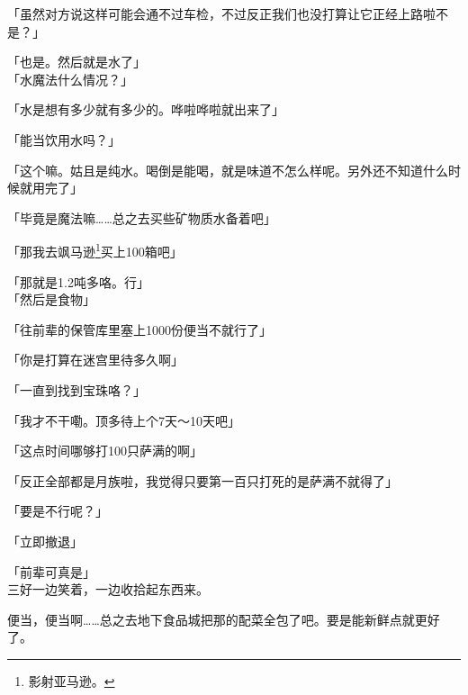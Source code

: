 「虽然对方说这样可能会通不过车检，不过反正我们也没打算让它正经上路啦不是？」

「也是。然后就是水了」\\

「水魔法什么情况？」

「水是想有多少就有多少的。哗啦哗啦就出来了」

「能当饮用水吗？」

「这个嘛。姑且是纯水。喝倒是能喝，就是味道不怎么样呢。另外还不知道什么时候就用完了」

「毕竟是魔法嘛……总之去买些矿物质水备着吧」

「那我去飒马逊\footnote{影射亚马逊。}买上100箱吧」

「那就是1.2吨多咯。行」\\

「然后是食物」

「往前辈的保管库里塞上1000份便当不就行了」

「你是打算在迷宫里待多久啊」

「一直到找到宝珠咯？」

「我才不干嘞。顶多待上个7天～10天吧」

「这点时间哪够打100只萨满的啊」

「反正全部都是月族啦，我觉得只要第一百只打死的是萨满不就得了」

「要是不行呢？」

「立即撤退」

「前辈可真是」\\

三好一边笑着，一边收拾起东西来。

便当，便当啊……总之去地下食品城把那的配菜全包了吧。要是能新鲜点就更好了。\\

